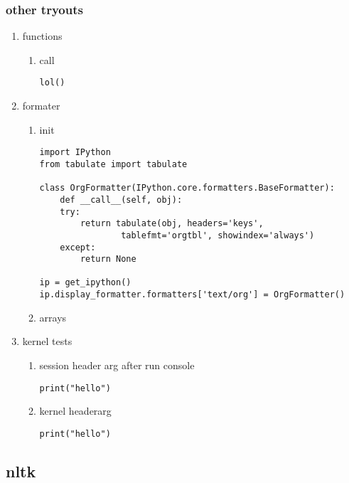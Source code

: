 \documentclass[11pt]{article}
\begin{document}
\subsubsection{other tryouts}
\label{sec:org1142b13}
\begin{enumerate}
\item functions
\label{sec:org3d37983}
\begin{enumerate}
\item call
\label{sec:org84ed862}
\begin{verbatim}
lol()
\end{verbatim}
\end{enumerate}

\item formater
\label{sec:org7dcd8e2}
\begin{enumerate}
\item init
\label{sec:orgfc49b9d}
\begin{verbatim}
import IPython
from tabulate import tabulate

class OrgFormatter(IPython.core.formatters.BaseFormatter):
    def __call__(self, obj):
	try:
	    return tabulate(obj, headers='keys',
			    tablefmt='orgtbl', showindex='always')
	except:
	    return None

ip = get_ipython()
ip.display_formatter.formatters['text/org'] = OrgFormatter()
\end{verbatim}
\item arrays
\label{sec:org798bba6}
\end{enumerate}

\item kernel tests
\label{sec:org8a7dc28}
\begin{enumerate}
\item session header arg after run console
\label{sec:orgdad64e8}
\begin{verbatim}
print("hello")
\end{verbatim}
\item kernel headerarg
\label{sec:orge023430}
\begin{verbatim}
print("hello")
\end{verbatim}
\end{enumerate}
\end{enumerate}
\subsection{nltk}
\label{sec:org7d65765}
\end{document}
